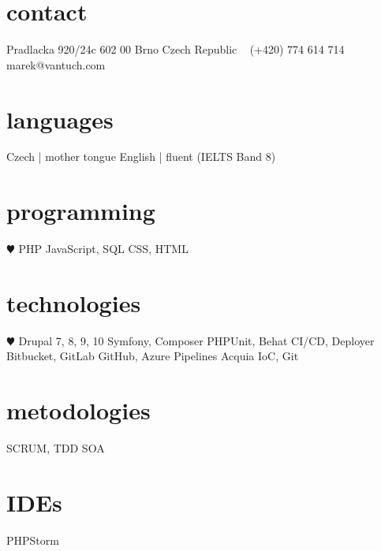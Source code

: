 \documentclass[]{friggeri-cv} %
\begin{document}


    \begin{aside} %
        \section{contact}
        Pradlacka 920/24c
        602 00 Brno
        Czech Republic
        ~
        (+420) 774 614 714
        ~
        marek@vantuch.com


        \section{languages}
        Czech | mother tongue
        English | fluent
        (IELTS Band 8)


        \section{programming}
        {\color{red} $\varheartsuit$} PHP
        JavaScript, SQL
        CSS, HTML


        \section{technologies}
        {\color{red} $\varheartsuit$} Drupal 7, 8, 9, 10
        Symfony, Composer
        PHPUnit, Behat
        CI/CD, Deployer
        Bitbucket, GitLab
        GitHub, Azure Pipelines
        Acquia
        IoC, Git


        \section{metodologies}
        SCRUM, TDD
        SOA


        \section{IDEs}
        PHPStorm
    \end{aside}

\end{document}
